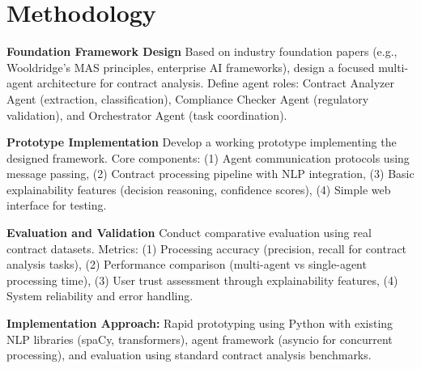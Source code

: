 
\section{Methodology}\label{section:methodology}

\textbf{Foundation Framework Design}
Based on industry foundation papers (e.g., Wooldridge's MAS principles, enterprise AI frameworks), design a focused multi-agent architecture for contract analysis. Define agent roles: Contract Analyzer Agent (extraction, classification), Compliance Checker Agent (regulatory validation), and Orchestrator Agent (task coordination).

\textbf{Prototype Implementation}
Develop a working prototype implementing the designed framework. Core components: (1) Agent communication protocols using message passing, (2) Contract processing pipeline with NLP integration, (3) Basic explainability features (decision reasoning, confidence scores), (4) Simple web interface for testing.

\textbf{Evaluation and Validation}
Conduct comparative evaluation using real contract datasets. Metrics: (1) Processing accuracy (precision, recall for contract analysis tasks), (2) Performance comparison (multi-agent vs single-agent processing time), (3) User trust assessment through explainability features, (4) System reliability and error handling.

\textbf{Implementation Approach:} Rapid prototyping using Python with existing NLP libraries (spaCy, transformers), agent framework (asyncio for concurrent processing), and evaluation using standard contract analysis benchmarks.
